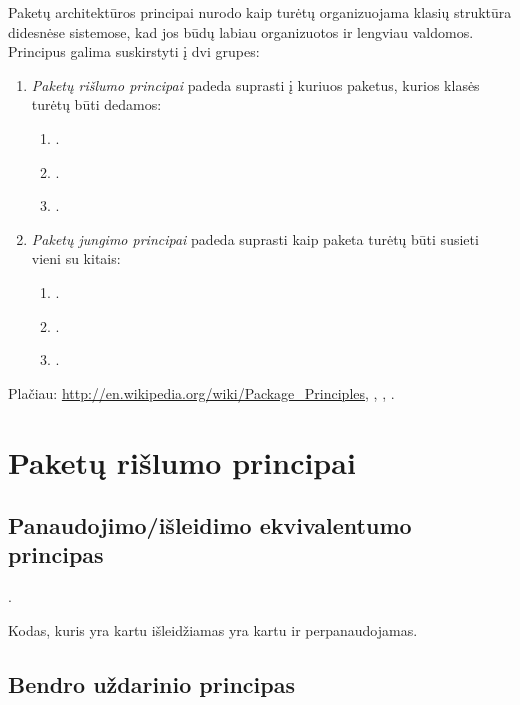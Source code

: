 
Paketų architektūros principai nurodo kaip turėtų organizuojama klasių
struktūra didesnėse sistemose, kad jos būdų labiau organizuotos
ir lengviau valdomos. Principus galima suskirstyti į dvi grupes:
\begin{enumerate}
  \item \emph{Paketų rišlumo principai} padeda suprasti į kuriuos
    paketus, kurios klasės turėtų būti dedamos:
    \begin{enumerate}
      \item {}.
      \item {}.
      \item {}.
    \end{enumerate}
  \item \emph{Paketų jungimo principai} padeda suprasti kaip paketa
    turėtų būti susieti vieni su kitais:
    \begin{enumerate}
      \item {}.
      \item {}.
      \item {}.
    \end{enumerate}
\end{enumerate}

Plačiau: \url{http://en.wikipedia.org/wiki/Package\_Principles},
\cite{martin2000design}, \cite{martin1995designing},
\cite{martin2003agile}.

\section{Paketų rišlumo principai}

\subsection{Panaudojimo/išleidimo ekvivalentumo principas}

\label{subsection:package:rep}

.

Kodas, kuris yra kartu išleidžiamas yra kartu ir perpanaudojamas.

\subsection{Bendro uždarinio principas}

